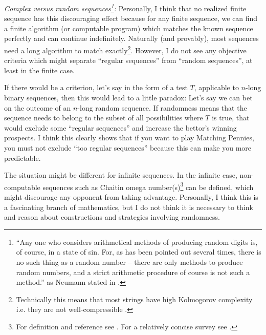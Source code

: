 \documentclass{article}
\begin{document}
{\it Complex versus random sequences\footnote{``Any one who considers arithmetical methods of producing random digits is, of course, in a state of
sin. For, as has been pointed out several times, there is no such thing as a random number -- there are only methods to produce random numbers, and a strict arithmetic procedure of course is not such a method.'' as Neumann stated in \cite{paper:Neumann1951Random}.}:}
Personally, I think that no realized finite sequence has this discouraging effect because for any finite sequence, we can find a finite algorithm (or computable program) which matches the known sequence perfectly and can continue indefinitely. Naturally (and provably), most sequences need a long algorithm to match exactly\footnote{Technically this means that most strings have high Kolmogorov complexity i.e. they are not well-compressible \cite{book:LiVitanyi}.}. However, I do not see any objective criteria which might separate ``regular sequences'' from ``random sequences'', at least in the finite case.

If there would be a criterion, let's say in the form of a test $T$, applicable to $n$-long binary sequences, then this would lead to a little paradox:
Let's say we can bet on the outcome of an $n$-long random sequence. If randomness means that the sequence needs to belong to the subset of all possibilities where $T$ is true, that would exclude some ``regular sequences'' and increase the bettor's winning prospects.
I think this clearly shows that if you want to play Matching Pennies, you must not exclude ``too regular sequences'' because this can make you more predictable.

The situation might be different for infinite sequences. In the infinite case, non-computable sequences such as Chaitin omega number(s)\footnote{For definition and reference see \cite{book:ChaitinOmega,book:InformationAndRandomness,book:LiVitanyi,book:AlgorithmicRandomnessAndComplexity}. For a relatively concise survey see \cite{arxiv:AspectsOfChaitinsOmega}.} can be defined, which might discourage any opponent from taking advantage.
Personally, I think this is a fascinating branch of mathematics, but I do not think it is necessary to think and reason about constructions and strategies involving randomness.
\end{document}
